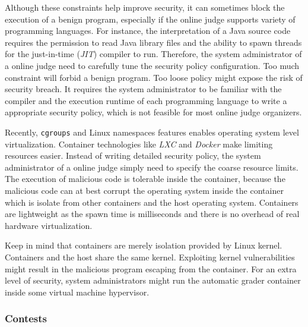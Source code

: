            Although these constraints help improve security,
            it can sometimes block the execution of a benign program,
            especially if the online judge supports variety of programming languages.
            For instance, the interpretation of a Java source code requires the permission to read
            Java library files and the ability to spawn threads for the just-in-time (\emph{JIT}) compiler to run.
            Therefore, the system administrator of a online judge need to carefully tune the security policy configuration.
            Too much constraint will forbid a benign program.
            Too loose policy might expose the risk of security breach.
            It requires the system administrator to be familiar with the compiler and the execution runtime
            of each programming language to write a appropriate security policy,
            which is not feasible for most online judge organizers.

            Recently, \texttt{cgroups} and Linux namespaces features enables operating system level virtualization.
            Container technologies like \emph{LXC} and \emph{Docker} make limiting resources easier.
            Instead of writing detailed security policy,
            the system administrator of a online judge simply need to specify the coarse resource limits.
            The execution of malicious code is tolerable inside the container,
            because the malicious code can at best corrupt the operating system inside the container
            which is isolate from other containers and the host operating system.
            Containers are lightweight as the spawn time is milliseconds and
            there is no overhead of real hardware virtualization.

            Keep in mind that containers are merely isolation provided by Linux kernel.
            Containers and the host share the same kernel.
            Exploiting kernel vulnerabilities might result in the malicious program escaping from the container.
            For an extra level of security,
            system administrators might run the automatic grader container inside some virtual machine hypervisor.

        \subsubsection{Contests}


